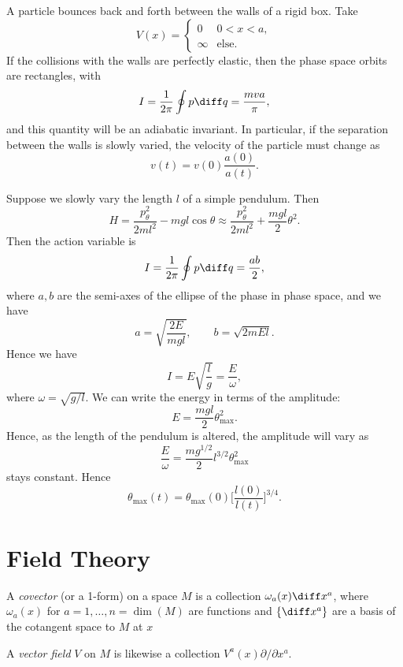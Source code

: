 \documentclass[12pt]{article}
\begin{document}
\begin{exbox}
	A particle bounces back and forth between the walls of a rigid box. Take
	\[
	V(x) =
	\begin{cases}
		0 & 0 < x < a,\\
		\infty & \text{else}.
	\end{cases}
	\]
	If the collisions with the walls are perfectly elastic, then the phase space orbits are rectangles, with
	\[
	I = \frac{1}{2 \pi} \oint p \diff q = \frac{mva}{\pi},
	\]
	and this quantity will be an adiabatic invariant. In particular, if the separation between the walls is slowly varied, the velocity of the particle must change as
	\[
	v(t) = v(0) \frac{a(0)}{a(t)}.
	\]
\end{exbox}

\begin{exbox}
	Suppose we slowly vary the length $l$ of a simple pendulum. Then
	\[
	H = \frac{p_\theta^2}{2ml^2} - mgl \cos \theta \approx \frac{p_\theta^2}{2 m l^2} + \frac{mgl}{2}\theta^2.
	\]
	Then the action variable is
	\[
	I = \frac{1}{2 \pi} \oint p \diff q = \frac{ab}{2},
	\]
	where $a, b$ are the semi-axes of the ellipse of the phase in phase space, and we have
	\[
		a = \sqrt{\frac{2E}{mgl}}, \qquad b = \sqrt{2m E l}.
	\]
	Hence we have
	\[
		I = E\sqrt{\frac{l}{g}} = \frac{E}{\omega},
	\]
	where $\omega = \sqrt{g/l}$. We can write the energy in terms of the amplitude:
	\[
	E = \frac{mgl}{2} \theta_{\mathrm{max}}^2.
	\]
	Hence, as the length of the pendulum is altered, the amplitude will vary as
	\[
	\frac{E}{\omega} = \frac{mg^{1/2}}{2} l^{3/2} \theta_{\mathrm{max}}^2
	\]
	stays constant. Hence
	\[
		\theta_{\mathrm{max}}(t) = \theta_{\mathrm{max}}(0) \biggl[ \frac{l(0)}{l(t)} \biggr]^{3/4}.
	\]

\end{exbox}


\newpage

\section{Field Theory}
\label{sec:ft}

A \emph{covector} (or a 1-form) on a space $M$ is a collection $\omega_a(x) \diff x^a$, where $\omega_a(x)$ for $a = 1, \ldots, n = \dim(M)$ are functions and $\{\diff x^a\}$ are a basis of the cotangent space to $M$ at $x$ 

A \emph{vector field} $V$ on $M$ is likewise a collection $V^a(x) \partial/\partial x^a$.
\end{document}
